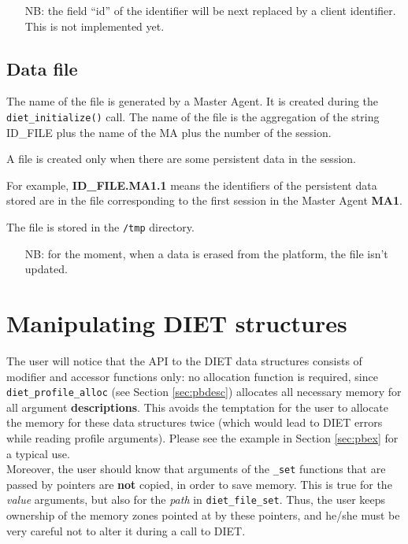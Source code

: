 \begin{itemize}
\item[NB:] the field ``id'' of the identifier will be next replaced by a
client identifier. This is not implemented yet.
\end{itemize}

\subsection{Data file}
\label{ssec:datafile}

The name of the file is generated by a Master Agent. It is created
during the \texttt{diet\_initialize()} call. The name of the file is
the aggregation of the string ID\_FILE plus the name of the MA plus
the number of the session.  

A file is created only when there are some persistent data in the
session.  

For example, \textbf{ID\_FILE.MA1.1} means the identifiers
of the persistent data stored are in the file corresponding to the
first session in the Master Agent \textbf{MA1}.

The file is stored in the \texttt{/tmp} directory.

\begin{itemize}
\item[NB:] for the moment, when a data is erased from the platform, the
file isn't updated.
\end{itemize}


\section{Manipulating DIET structures}
\label{sec:manip}

The user will notice that the API to the DIET data structures consists of
modifier and accessor functions only: no allocation function is required, since
\texttt{diet\_profile\_alloc} (see Section \ref{sec:pbdesc}) allocates all
necessary memory for all argument \textbf{descriptions}. This avoids the
temptation for the user to allocate the memory for these data structures twice
(which would lead to DIET errors while reading profile arguments). Please see
the example in Section \ref{sec:pbex} for a typical use.
\\

Moreover, the user should know that arguments of the \texttt{\_set} functions
that are passed by pointers are \textbf{not} copied, in order to save memory.
This is true for the \emph{value} arguments, but also for the \emph{path} in
\texttt{diet\_file\_set}. Thus, the user keeps ownership of the memory zones
pointed at by these pointers, and he/she must be very careful not to alter it
during a call to DIET.

